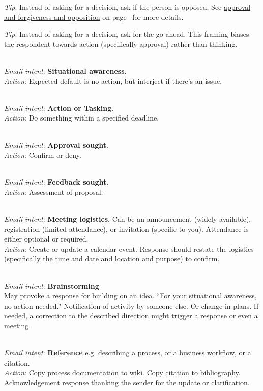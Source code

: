 \textit{Tip}: Instead of asking for a decision, ask if the person is opposed. See 
\hyperref[sec:approval-forgiveness-opposition]{approval and forgiveness and opposition} on 
page~\pageref{sec:approval-forgiveness-opposition} 
for more details.

\textit{Tip}: Instead of asking for a decision, ask for the go-ahead. This framing biases the respondent towards action (specifically approval) rather than thinking. 

\ \\
\textit{Email intent}: \textbf{Situational awareness}.\\
\textit{Action}: Expected default is no action, but interject if there's an issue.

\ \\
\textit{Email intent}: \textbf{Action or Tasking}.\\
\textit{Action}: Do something within a specified deadline.

\ \\
\textit{Email intent}: \textbf{Approval sought}.\\
\textit{Action}: Confirm or deny.

\ \\
\textit{Email intent}: \textbf{Feedback sought}.\\
\textit{Action}: Assessment of proposal.

\ \\
\textit{Email intent}: \textbf{Meeting logistics}. Can be an announcement (widely available), registration (limited attendance), or invitation (specific to you). Attendance is either optional or required. \\
\textit{Action}: Create or update a calendar event.
Response should restate the logistics (specifically the time and date and location and purpose) to confirm. 

\ \\
\textit{Email intent}: \textbf{Brainstorming}\\
May provoke a response for building on an idea.
``For your situational awareness, no action needed." Notification of activity by someone else. Or change in plans. 
If needed, a correction to the described direction might trigger a response or even a meeting.

\ \\
\textit{Email intent}: \textbf{Reference} e.g. describing a process, or a business workflow, or a citation.\\
\textit{Action}: Copy process documentation to wiki. Copy citation to bibliography.
Acknowledgement response thanking the sender for the update or clarification.

